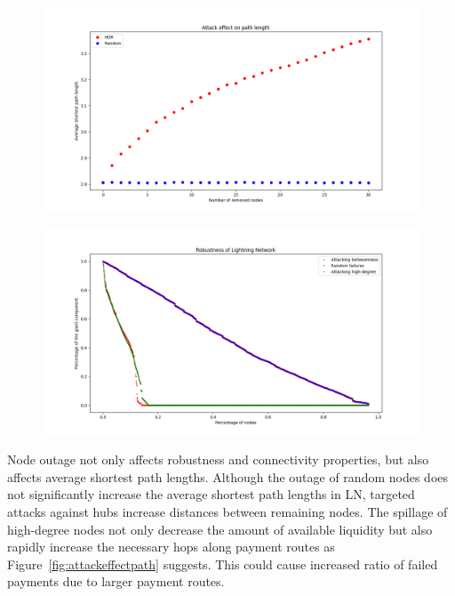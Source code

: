 \documentclass[runningheads]{llncs}
\begin{document}
\begin{figure}[h]
	\centering
	\begin{minipage}{.5\textwidth}
		\centering
		\includegraphics[width=\linewidth]{attackEffectPathLength.png}
		\label{fig:attackeffectpath}
	\end{minipage}%
	\begin{minipage}{.5\textwidth}
		\centering
		\includegraphics[width=\linewidth]{randomHighBetweenness.png}
		\label{fig:randhighbetween}
	\end{minipage}
\end{figure}

Node outage not only affects robustness and connectivity properties, but also affects average shortest path lengths. Although the outage of random nodes does not significantly increase the average shortest path lengths in LN, targeted attacks against hubs increase distances between remaining nodes. The spillage of high-degree nodes not only decrease the amount of available liquidity but also rapidly increase the necessary hops along payment routes as Figure~\ref{fig:attackeffectpath} suggests. This could cause increased ratio of failed payments due to larger payment routes.
\end{document}
